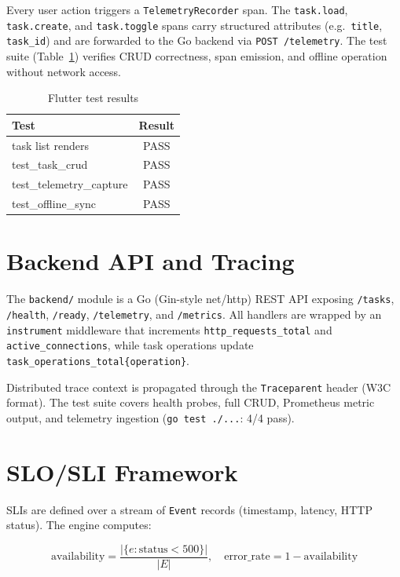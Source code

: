 \documentclass[10pt,journal]{IEEEtran}
\begin{document}
Every user action triggers a \texttt{TelemetryRecorder} span. The
\texttt{task.load}, \texttt{task.create}, and \texttt{task.toggle} spans carry
structured attributes (e.g.\ \texttt{title}, \texttt{task\_id}) and are
forwarded to the Go backend via \texttt{POST /telemetry}. The test suite
(Table~\ref{tab:flutter}) verifies CRUD correctness, span emission, and offline
operation without network access.

\begin{table}[h]
\centering
\caption{Flutter test results}
\label{tab:flutter}
\begin{tabular}{lc}
\toprule
Test & Result \\
\midrule
task list renders & PASS \\
test\_task\_crud & PASS \\
test\_telemetry\_capture & PASS \\
test\_offline\_sync & PASS \\
\bottomrule
\end{tabular}
\end{table}

\section{Backend API and Tracing}
\label{sec:backend}

The \texttt{backend/} module is a Go (Gin-style net/http) REST API exposing
\texttt{/tasks}, \texttt{/health}, \texttt{/ready}, \texttt{/telemetry}, and
\texttt{/metrics}. All handlers are wrapped by an \texttt{instrument} middleware
that increments \texttt{http\_requests\_total} and \texttt{active\_connections},
while task operations update \texttt{task\_operations\_total\{operation\}}.

Distributed trace context is propagated through the \texttt{Traceparent} header
(W3C format). The test suite covers health probes, full CRUD, Prometheus metric
output, and telemetry ingestion (\texttt{go test ./...}: 4/4 pass).

\section{SLO/SLI Framework}
\label{sec:slo}

SLIs are defined over a stream of \texttt{Event} records (timestamp, latency,
HTTP status). The engine computes:

\[
\text{availability} = \frac{|\{e : \text{status} < 500\}|}{|E|}, \quad
\text{error\_rate} = 1 - \text{availability}
\]
\end{document}
